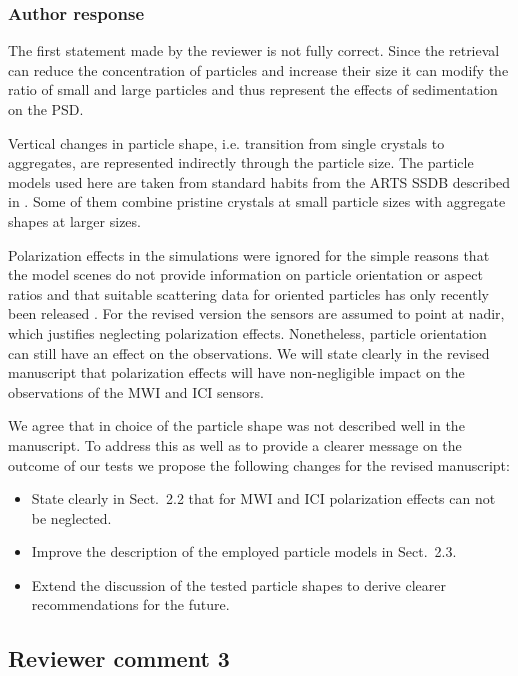 \documentclass[11pt]{scrartcl}
\begin{document}
\subsubsection*{Author response}

The first statement made by the reviewer is not fully correct. Since the retrieval
can reduce the concentration of particles and increase their size it can modify
the ratio of small and large particles and thus represent the effects of sedimentation
on the PSD.

Vertical changes in particle shape, i.e. transition from single crystals to
aggregates, are represented indirectly through the particle size. The particle
models used here are taken from standard habits from the ARTS SSDB described in
\cite{eriksson18}. Some of them combine pristine crystals at small particle
sizes with aggregate shapes at larger sizes.

Polarization effects in the simulations were ignored for the simple reasons that
the model scenes do not provide information on particle orientation or aspect
ratios and that suitable scattering data for oriented particles has only
recently been released \citep{brath19}. For the revised version the sensors are
assumed to point at nadir, which justifies neglecting polarization effects.
Nonetheless, particle orientation can still have an effect on the observations.
We will state clearly in the revised manuscript that polarization effects will
have non-negligible impact on the observations of the MWI and ICI sensors.

We agree that in choice of the particle shape was not described well in the
manuscript. To address this as well as to provide a clearer message on the
outcome of our tests we propose the following changes for the revised
manuscript:

\begin{itemize}
\item State clearly in Sect.~2.2 that for MWI and ICI polarization effects can
  not be neglected.
\item Improve the description of the employed particle models in Sect.~2.3.
\item Extend the discussion of the tested particle shapes to derive clearer
  recommendations for the future.
\end{itemize}

\subsection*{Reviewer comment 3}
\end{document}
